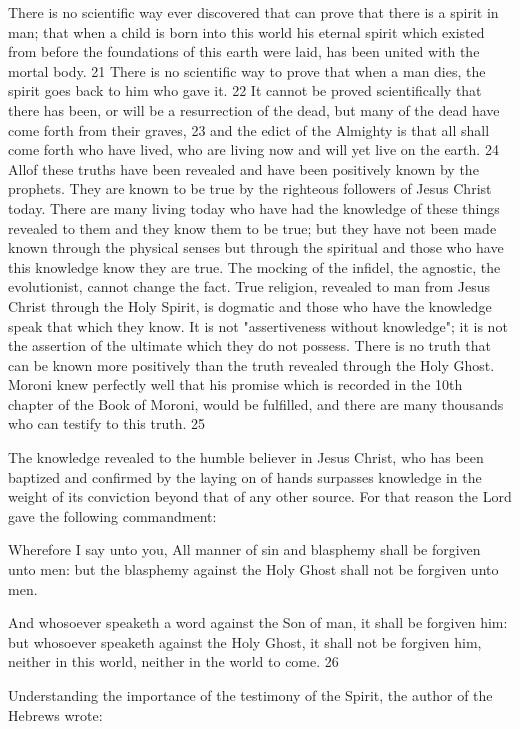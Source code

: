 There is no scientific way ever discovered that can prove that there is a spirit in man; that
when a child is born into this world his eternal spirit which existed from before the
foundations of this earth were laid, has been united with the mortal body. 21 There is no
scientific way to prove that when a man dies, the spirit goes back to him who gave it. 22 It
cannot be proved scientifically that there has been, or will be a resurrection of the dead, but
many of the dead have come forth from their graves, 23 and the edict of the Almighty is that
all shall come forth who have lived, who are living now and will yet live on the earth. 24 Allof these truths have been revealed and have been positively known by the prophets. They are
known to be true by the righteous followers of Jesus Christ today. There are many living
today who have had the knowledge of these things revealed to them and they know them to
be true; but they have not been made known through the physical senses but through the
spiritual and those who have this knowledge know they are true. The mocking of the infidel,
the agnostic, the evolutionist, cannot change the fact. True religion, revealed to man from
Jesus Christ through the Holy Spirit, is dogmatic and those who have the knowledge speak
that which they know. It is not "assertiveness without knowledge"; it is not the assertion of
the ultimate which they do not possess. There is no truth that can be known more positively
than the truth revealed through the Holy Ghost. Moroni knew perfectly well that his promise
which is recorded in the 10th chapter of the Book of Moroni, would be fulfilled, and there are
many thousands who can testify to this truth. 25

The knowledge revealed to the humble believer in Jesus Christ, who has been baptized and
confirmed by the laying on of hands surpasses knowledge in the weight of its conviction
beyond that of any other source. For that reason the Lord gave the following commandment:

Wherefore I say unto you, All manner of sin and blasphemy shall be forgiven unto men: but
the blasphemy against the Holy Ghost shall not be forgiven unto men.

And whosoever speaketh a word against the Son of man, it shall be forgiven him: but
whosoever speaketh against the Holy Ghost, it shall not be forgiven him, neither in this
world, neither in the world to come. 26

Understanding the importance of the testimony of the Spirit, the author of the Hebrews
wrote:

